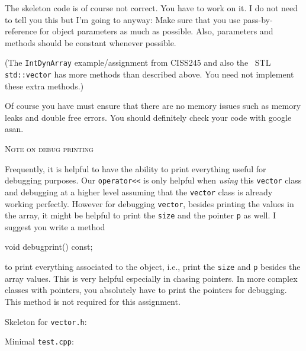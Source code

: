 The skeleton code is of course not correct. You have to work on it.
I do not need to tell you this but I'm going to anyway:
Make sure that you use pass-by-reference for object parameters
as much as possible.
Also, parameters and methods should be constant whenever possible.

(The \verb!IntDynArray! example/assignment from CISS245 and also
the \cpp\ STL \verb!std::vector! has more methods
than described above.
You need not implement these extra methods.)

Of course you have must ensure that there are no memory issues such as
memory leaks and double free errors.
You should definitely check your code with google asan.

\newpage
\textsc{Note on debug printing}

Frequently, it is helpful to have the ability to print everything
useful for debugging purposes.
Our \verb!operator<<! is only helpful when \textit{using} this
\verb!vector! class and debugging at a higher level assuming that
the \verb!vector! class is already working perfectly.
However for debugging \verb!vector!,
besides printing the values in the 
array, it might be helpful to print the \verb!size! and the pointer
\verb!p! as well.
I suggest you write a method
\begin{console}[fontsize=\footnotesize]
void debugprint() const;
\end{console}
to print everything associated to the object, i.e.,
print the \verb!size! and \verb!p! besides the array values.
This is very helpful especially in chasing pointers.
In more complex classes with pointers, you absolutely have to print the 
pointers for debugging.
This method is not required for this assignment.


\newpage
Skeleton for \verb!vector.h!:
{\footnotesize
{}
}

\newpage
Minimal \verb!test.cpp!:
{\footnotesize
{}
}
